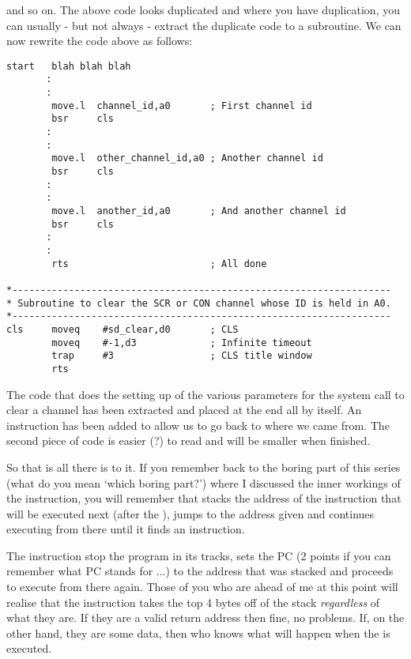and so on. The above code looks duplicated and where you have
    duplication, you can usually -{} but not always -{} extract the duplicate code
    to a subroutine. We can now rewrite the code above as follows:

\begin{lstlisting}[firstnumber=1,caption={Example of Non-repetitive Code},label={lst:ExampleOfNonRepetetiveCode}]
start   blah blah blah
       :
       :
        move.l  channel_id,a0       ; First channel id
        bsr     cls
       :
       :
        move.l  other_channel_id,a0 ; Another channel id
        bsr     cls
       :
       :
        move.l  another_id,a0       ; And another channel id
        bsr     cls
       :
       :
        rts                         ; All done

*-------------------------------------------------------------------
* Subroutine to clear the SCR or CON channel whose ID is held in A0.
*-------------------------------------------------------------------
cls     moveq    #sd_clear,d0       ; CLS
        moveq    #-1,d3             ; Infinite timeout
        trap     #3                 ; CLS title window
        rts
\end{lstlisting}

The code that does the setting up of the various parameters for the
    system call to clear a channel has been extracted and placed at the end
    all by itself. An  instruction has been added to allow us to go back to
    where we came from. The second piece of code is easier (?) to read and
    will be smaller when finished.

So that is all there is to it. If you remember back to the boring
    part of this series (what do you mean `which boring part?') where I
    discussed the inner workings of the  instruction, you will remember
    that  stacks the address of the instruction that will be executed next
    (after the ), jumps to the address given and continues executing from
    there until it finds an  instruction.

The  instruction stop the program in its tracks, sets the PC (2
    points if you can remember what PC stands for ...) to the address that was
    stacked and proceeds to execute from there again. Those of you who are
    ahead of me at this point will realise that the  instruction takes the
    top 4 bytes off of the stack \emph{regardless} of what they are. If they are a
    valid return address then fine, no problems. If, on the other hand, they
    are some data, then who knows what will happen when the  is
    executed.

